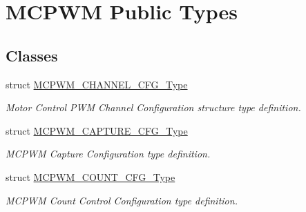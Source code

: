\hypertarget{group___m_c_p_w_m___public___types}{\section{\-M\-C\-P\-W\-M \-Public \-Types}
\label{group___m_c_p_w_m___public___types}
}
\subsection*{\-Classes}
\begin{DoxyCompactItemize}
\item 
struct \hyperlink{struct_m_c_p_w_m___c_h_a_n_n_e_l___c_f_g___type}{\-M\-C\-P\-W\-M\-\_\-\-C\-H\-A\-N\-N\-E\-L\-\_\-\-C\-F\-G\-\_\-\-Type}
\begin{DoxyCompactList}\small\item\em \-Motor \-Control \-P\-W\-M \-Channel \-Configuration structure type definition. \end{DoxyCompactList}\item 
struct \hyperlink{struct_m_c_p_w_m___c_a_p_t_u_r_e___c_f_g___type}{\-M\-C\-P\-W\-M\-\_\-\-C\-A\-P\-T\-U\-R\-E\-\_\-\-C\-F\-G\-\_\-\-Type}
\begin{DoxyCompactList}\small\item\em \-M\-C\-P\-W\-M \-Capture \-Configuration type definition. \end{DoxyCompactList}\item 
struct \hyperlink{struct_m_c_p_w_m___c_o_u_n_t___c_f_g___type}{\-M\-C\-P\-W\-M\-\_\-\-C\-O\-U\-N\-T\-\_\-\-C\-F\-G\-\_\-\-Type}
\begin{DoxyCompactList}\small\item\em \-M\-C\-P\-W\-M \-Count \-Control \-Configuration type definition. \end{DoxyCompactList}\end{DoxyCompactItemize}
